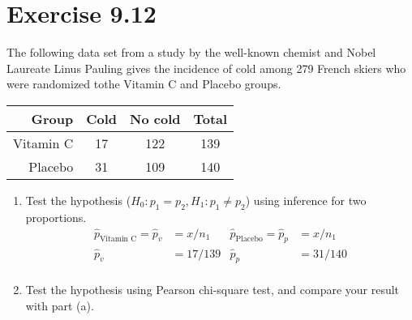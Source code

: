 \documentclass{article}
\begin{document}
\section*{Exercise 9.12}

The following data set from a study by the well-known chemist and Nobel Laureate Linus Pauling gives the incidence of cold among 279 French skiers who were randomized tothe Vitamin C and Placebo groups.

\begin{center}
	\begin{tabular}{|r|c|c|c|}
		\hline
		Group & Cold & No cold & Total\\
		\hline
		Vitamin C & 17 & 122 & 139 \\
		\hline
		Placebo & 31 & 109 & 140 \\
		\hline
	\end{tabular}
\end{center}

\begin{enumerate}[\quad(a)]
	\item Test the hypothesis ($ H_0: p_1 = p_2, H_1: p_1 \neq p_2 $) using inference for two proportions.
	\begin{align*}
		\hat{p}_{\text{Vitamin C}} = \hat{p}_v &= x/n_1 & \hat{p}_{\text{Placebo}} = \hat{p}_p &= x/n_1 \\
		\hat{p}_v &= 17/139 & \hat{p}_p &= 31/140\\
	\end{align*}
	\item Test the hypothesis using Pearson chi-square test, and compare your result with part (a).
\end{enumerate}
\end{document}
